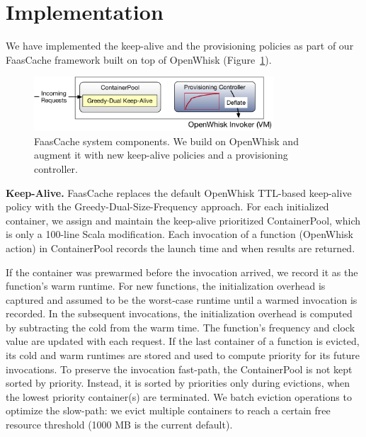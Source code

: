 \section{Implementation}

We have implemented the keep-alive and the provisioning policies as part of our FaasCache framework built on top of OpenWhisk (Figure~\ref{fig:sys}). 

\begin{figure}[t]
  \centering
  \includegraphics[width=0.8\textwidth]{faascache/faas-keepalive-20/figures/faascache.pdf}
  \caption{FaasCache system components. We build on OpenWhisk and augment it with new keep-alive policies and a provisioning controller. }
  \label{fig:sys}
\end{figure}

\noindent \textbf{Keep-Alive.}
FaasCache replaces the default OpenWhisk TTL-based keep-alive policy with the Greedy-Dual-Size-Frequency approach. 
For each initialized container, we assign and maintain the keep-alive prioritized ContainerPool, which is only a 100-line Scala modification. 
Each invocation of a function (OpenWhisk action) in ContainerPool records the launch time and when results are returned.


If the container was prewarmed before the invocation arrived, we record it as the function's warm runtime.
For new functions, the initialization overhead is captured and assumed to be the worst-case runtime until a warmed invocation is recorded. %
In the subsequent invocations, the initialization overhead is computed by subtracting the cold from the warm time. 
The function's frequency and clock value are updated with each request.
If the last container of a function is evicted, its cold and warm runtimes are stored and used to compute priority for its future invocations. 
%
To preserve the invocation fast-path, the ContainerPool is not kept sorted by priority. 
Instead, it is sorted by priorities only during evictions, when the lowest priority container(s) are terminated.
%
We batch eviction operations to optimize the slow-path: we evict multiple containers to reach a certain free resource threshold (1000 MB is the current default). 

